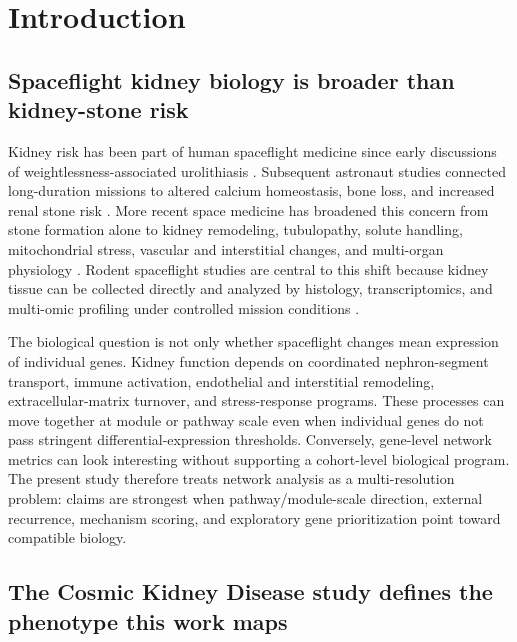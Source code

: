 \documentclass[11pt]{article}
\begin{document}
\clearpage
\tableofcontents
\clearpage

\section{Introduction}

\subsection{Spaceflight kidney biology is broader than kidney-stone risk}

Kidney risk has been part of human spaceflight medicine since early discussions of weightlessness-associated urolithiasis \citep{cockett1962astronautical}. Subsequent astronaut studies connected long-duration missions to altered calcium homeostasis, bone loss, and increased renal stone risk \citep{pietrzyk2007renal,smith2014men}. More recent space medicine has broadened this concern from stone formation alone to kidney remodeling, tubulopathy, solute handling, mitochondrial stress, vascular and interstitial changes, and multi-organ physiology \citep{siew2024cosmic,chouker2025impact,afshinnekoo2020fundamental}. Rodent spaceflight studies are central to this shift because kidney tissue can be collected directly and analyzed by histology, transcriptomics, and multi-omic profiling under controlled mission conditions \citep{daSilveira2020comprehensive,galazka2020rnaseq,finch2025strain}.

The biological question is not only whether spaceflight changes mean expression of individual genes. Kidney function depends on coordinated nephron-segment transport, immune activation, endothelial and interstitial remodeling, extracellular-matrix turnover, and stress-response programs. These processes can move together at module or pathway scale even when individual genes do not pass stringent differential-expression thresholds. Conversely, gene-level network metrics can look interesting without supporting a cohort-level biological program. The present study therefore treats network analysis as a multi-resolution problem: claims are strongest when pathway/module-scale direction, external recurrence, mechanism scoring, and exploratory gene prioritization point toward compatible biology.

\subsection{The Cosmic Kidney Disease study defines the phenotype this work maps}
\end{document}
